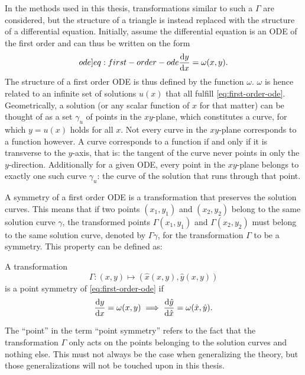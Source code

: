In the methods used in this thesis, transformations similar to such a \(\Gamma\) are considered, but the structure of a triangle is instead replaced with the structure of a differential equation.
Initially, assume the differential equation is an ODE of the first order and can thus be written on the form
\begin{equation} \label[ode]{eq:first-order-ode}
  \diff{y}{x} = \omega(x,y).
\end{equation}
The structure of a first order ODE is thus defined by the function \(\omega\).
\(\omega\) is hence related to an infinite set of solutions \(u(x)\) that all fulfill \cref{eq:first-order-ode}.
Geometrically, a solution (or any scalar function of \(x\) for that matter) can be thought of as a set \(\gamma_u\) of points in the \(xy\)-plane, which constitutes a curve, for which \(y = u(x)\) holds for all \(x\).
Not every curve in the \(xy\)-plane corresponds to a function however.
A curve corresponds to a function if and only if it is transverse to the \(y\)-axis, that is: the tangent of the curve never points in only the \(y\)-direction.
Additionally for a given ODE, every point in the \(xy\)-plane belongs to exactly one such curve \(\gamma_u\): the curve of the solution that runs through that point.

A symmetry of a first order ODE  is a transformation that preserves the solution curves.
This means that if two points \(\left(x_1,y_1\right)\) and \(\left(x_2,y_2\right)\) belong to the same solution curve \(\gamma\), the transformed points \(\Gamma(x_1,y_1)\) and \(\Gamma(x_2,y_2)\) must belong to the same solution curve, denoted by \(\Gamma\gamma\), for the transformation \(\Gamma\) to be a symmetry.
This property can be defined as:
\begin{defn} \label{defn:first-order-symmetry}
  A transformation 
  \begin{equation*}
    \Gamma: \left(x,y\right) \mapsto \left(\hat{x}(x,y), \hat{y}(x,y)\right)
  \end{equation*}
  is a point symmetry of \cref{eq:first-order-ode} if
  \begin{equation*}
    \diff{y}{x} = \omega(x,y)
    \implies
    \diff{\hat{y}}{\hat{x}} = \omega(\hat{x},\hat{y}).
  \end{equation*}
\end{defn}
The \enquote{point} in the term \enquote{point symmetry} refers to the fact that the transformation \(\Gamma\) only acts on the points belonging to the solution curves and nothing else.
This must not always be the case when generalizing the theory, but those generalizations will not be touched upon in this thesis.

